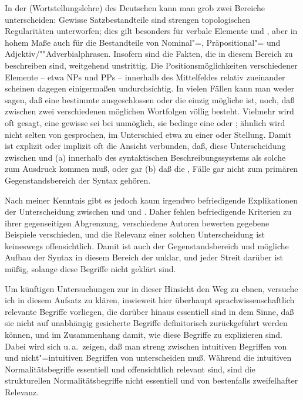 \documentclass[output=paper]{langsci/langscibook}
\begin{document}
\largerpage
In der  (Wortstellungslehre) des Deutschen kann man grob zwei Bereiche unterscheiden: Gewisse Satzbestandteile sind strengen topologischen Regularitäten unterworfen; dies gilt besonders für verbale Elemente und , aber in hohem Maße auch für die Bestandteile von Nominal"=, Präpositional"= und Adjektiv/""Adverbialphrasen. Insofern sind die Fakten, die in diesem Bereich zu beschreiben sind, weitgehend unstrittig. Die Positionsmöglichkeiten verschiedener Elemente -- etwa NPs und PPs --  innerhalb des Mittelfeldes relativ zueinander scheinen dagegen einigermaßen undurchsichtig. In vielen Fällen kann man weder sagen, daß eine bestimmte  ausgeschlossen oder die einzig mögliche ist, noch, daß zwischen zwei verschiedenen möglichen Wortfolgen völlig  besteht. Vielmehr wird oft gesagt, eine gewisse  sei bei   unmöglich, sie bedinge eine  oder  ; ähnlich wird nicht selten von   gesprochen, im Unterschied etwa zu einer  oder  Stellung. Damit ist explizit oder implizit oft die Ansicht verbunden, daß, diese Unterscheidung zwischen  und  (a) innerhalb des syntaktischen Beschreibungssystems als solche zum Ausdruck kommen muß, oder gar (b) daß die ,  Fälle gar nicht zum primären Gegenstandsbereich der Syntax gehören.

Nach meiner Kenntnis gibt es jedoch kaum irgendwo befriedigende Explikationen der Unterscheidung zwischen  und   und . Daher fehlen befriedigende Kriterien zu ihrer gegenseitigen Abgrenzung, verschiedene Autoren bewerten gegebene Beispiele verschieden, und die Relevanz einer solchen Unterscheidung ist keineswegs offensichtlich. Damit ist auch der Gegenstandsbereich und mögliche Aufbau der Syntax in diesem Bereich der  unklar, und jeder Streit darüber ist müßig, solange diese Begriffe nicht geklärt sind.

Um künftigen Untersuchungen zur  in dieser Hinsicht den Weg zu ebnen, versuche ich in diesem Aufsatz zu klären, inwieweit hier überhaupt sprachwissenschaftlich relevante Begriffe vorliegen, die darüber hinaus essentiell sind in dem Sinne, daß sie nicht auf unabhängig gesicherte Begriffe definitorisch zurückgeführt werden können, und im Zusammenhang damit, wie diese Begriffe zu explizieren sind. Dabei wird sich u.\,a.\ zeigen, daß man streng zwischen intuitiven Begriffen von  und nicht"=intuitiven Begriffen von  unterscheiden muß. Während die intuitiven Normalitätsbegriffe essentiell und offensichtlich relevant sind, sind die strukturellen Normalitätsbegriffe nicht essentiell und von bestenfalls zweifelhafter Relevanz.
\end{document}
